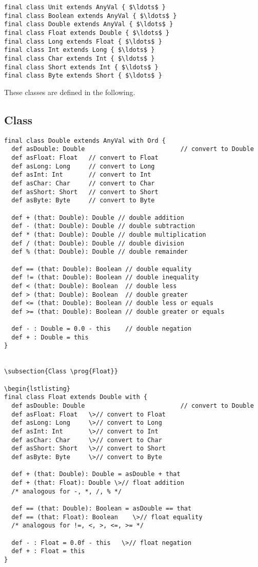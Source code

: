\documentclass[a4paper,12pt,twoside,titlepage]{book}
\begin{document}
\begin{lstlisting}
final class Unit extends AnyVal { $\ldots$ }
final class Boolean extends AnyVal { $\ldots$ }
final class Double extends AnyVal { $\ldots$ }
final class Float extends Double { $\ldots$ }
final class Long extends Float { $\ldots$ }
final class Int extends Long { $\ldots$ }
final class Char extends Int { $\ldots$ }
final class Short extends Int { $\ldots$ }
final class Byte extends Short { $\ldots$ }
\end{lstlisting}

These classes are defined in the following.

\subsection{Class }

\begin{lstlisting}
final class Double extends AnyVal with Ord {
  def asDouble: Double                          // convert to Double
  def asFloat: Float   // convert to Float
  def asLong: Long     // convert to Long
  def asInt: Int       // convert to Int
  def asChar: Char     // convert to Char
  def asShort: Short   // convert to Short
  def asByte: Byte     // convert to Byte

  def + (that: Double): Double // double addition
  def - (that: Double): Double // double subtraction
  def * (that: Double): Double // double multiplication
  def / (that: Double): Double // double division
  def % (that: Double): Double // double remainder

  def == (that: Double): Boolean // double equality
  def != (that: Double): Boolean // double inequality
  def < (that: Double): Boolean  // double less
  def > (that: Double): Boolean  // double greater
  def <= (that: Double): Boolean // double less or equals
  def >= (that: Double): Boolean // double greater or equals

  def - : Double = 0.0 - this    // double negation
  def + : Double = this
}


\subsection{Class \prog{Float}}

\begin{lstlisting}
final class Float extends Double with {
  def asDouble: Double                          // convert to Double
  def asFloat: Float   \>// convert to Float
  def asLong: Long     \>// convert to Long
  def asInt: Int       \>// convert to Int
  def asChar: Char     \>// convert to Char
  def asShort: Short   \>// convert to Short
  def asByte: Byte     \>// convert to Byte

  def + (that: Double): Double = asDouble + that
  def + (that: Float): Double \>// float addition
  /* analogous for -, *, /, % */

  def == (that: Double): Boolean = asDouble == that
  def == (that: Float): Boolean    \>// float equality
  /* analogous for !=, <, >, <=, >= */

  def - : Float = 0.0f - this   \>// float negation
  def + : Float = this
}
\end{lstlisting}
\end{document}
